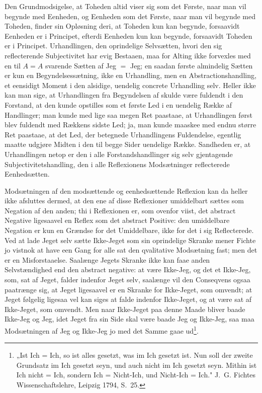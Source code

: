 \documentclass[12pt]{book}
\newcommand{\opage}[1]{\marginnote{\footnotesize\textit{[#1]}}}
\begin{document}
Den Grundmodsigelse, at Toheden altid viser sig som det Første, naar man vil
begynde med Eenheden, og Eenheden som det Første, naar man vil begynde med Toheden,
finder sin Opløsning deri, at Toheden kun kan begynde, forsaavidt Eenheden er i
Principet, efterdi Eenheden kun kan begynde, forsaavidt Toheden er i Principet.
Urhandlingen, den oprindelige Selvsætten, hvori den sig reflecterende Subjectivitet
har evig Bestaaen, maa for Alting ikke forvexles med en til $A = A$ svarende Sætten
af Jeg $=$ Jeg; en saadan første almindelig Sætten er kun en Begyndelsessætning,
ikke en Urhandling, men en Abstractionshandling, et eensidigt Moment i den
alsidige, uendelig concrete Urhandling selv. Heller ikke kan man sige, at
Urhandlingen fra Begyndelsen af skulde være fuldendt i den Forstand, at den kunde
opstilles som et første Led i en uendelig Række af Handlinger; man kunde med lige
saa megen Ret paastaae, at Urhandlingen først blev fuldendt med Rækkens sidste Led;
ja, man kunde maaskee med endnu større Ret paastaae, at det Led, der betegnede
Urhandlingens Fuldendelse, egentlig maatte udgjøre Midten i den til
\opage{68} begge Sider uendelige Række. Sandheden er, at Urhandlingen netop er den i alle
Forstandshandlinger sig selv gjentagende Subjectivitetshandling, den i alle
Reflexionens Modsætninger reflecterede Eenhedsætten.

Modsætningen af den modsættende og eenhedsættende Reflexion kan da heller ikke
afsluttes dermed, at den ene af disse Reflexioner umiddelbart sættes som Negation
af den anden; thi i Reflexionen er, som ovenfor viist, det abstract Negative
ligesaavel en Reflex som det abstract Positive: den umiddelbare Negation er kun en
Grændse for det Umiddelbare, ikke for det i sig Reflecterede. Ved at lade Jeget
selv sætte Ikke-Jeget som sin oprindelige Skranke mener Fichte jo vistnok at have
een Gang for alle sat den qvalitative Modsætning fast; men det er en
Misforstaaelse. Saalænge Jegets Skranke ikke kan faae anden Selvstændighed end den
abstract negative: at være Ikke-Jeg, og det et Ikke-Jeg, som, sat af Jeget, falder
indenfor Jeget selv, saalænge vil den Conseqvens ogsaa paatrænge sig, at Jeget
ligesaavel er en Skranke for Ikke-Jeget, som omvendt; at Jeget følgelig ligesaa vel
kan siges at falde indenfor Ikke-Jeget, og at være sat af Ikke-Jeget, som omvendt.
Men naar Ikke-Jeget paa denne Maade bliver baade Ikke-Jeg og Jeg, idet Jeget fra
sin Side skal være baade Jeg og Ikke-Jeg, saa maa Modsætningen af Jeg og Ikke-Jeg
jo med det Samme gaae ud\footnote{„Ist Ich = Ich, so ist alles gesetzt, was im Ich
gesetzt ist. Nun soll der zweite Grundsatz im Ich gesetzt seyn, und auch nicht im
Ich gesetzt seyn. Mithin ist Ich nicht = Ich, sondern Ich = Nicht-Ich, und
Nicht-Ich = Ich." J.~G. Fichtes Wissenschaftslehre, Leipzig 1794, S.~25.}.
\end{document}
